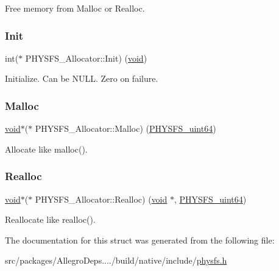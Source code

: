 Free memory from Malloc or Realloc. \mbox{\label{struct_p_h_y_s_f_s___allocator_a61dd95a74a5c9557645249b30e41d933}} 
\subsubsection{\texorpdfstring{Init}{Init}}
{\footnotesize\ttfamily int($\ast$ P\+H\+Y\+S\+F\+S\+\_\+\+Allocator\+::\+Init) (\hyperlink{png_8h_ac9c84fa68bbad002983e35ce3663c686}{void})}

Initialize. Can be N\+U\+LL. Zero on failure. \mbox{\label{struct_p_h_y_s_f_s___allocator_a470bc12185fbcef62ebf509fdf1870b5}} 
\subsubsection{\texorpdfstring{Malloc}{Malloc}}
{\footnotesize\ttfamily \hyperlink{png_8h_ac9c84fa68bbad002983e35ce3663c686}{void}$\ast$($\ast$ P\+H\+Y\+S\+F\+S\+\_\+\+Allocator\+::\+Malloc) (\hyperlink{physfs_8h_a632ba02500231e5f6f6df2e4cb71c818}{P\+H\+Y\+S\+F\+S\+\_\+uint64})}

Allocate like malloc(). \mbox{\label{struct_p_h_y_s_f_s___allocator_abc71951013cda22b8177b831bfaf8579}} 
\subsubsection{\texorpdfstring{Realloc}{Realloc}}
{\footnotesize\ttfamily \hyperlink{png_8h_ac9c84fa68bbad002983e35ce3663c686}{void}$\ast$($\ast$ P\+H\+Y\+S\+F\+S\+\_\+\+Allocator\+::\+Realloc) (\hyperlink{png_8h_ac9c84fa68bbad002983e35ce3663c686}{void} $\ast$, \hyperlink{physfs_8h_a632ba02500231e5f6f6df2e4cb71c818}{P\+H\+Y\+S\+F\+S\+\_\+uint64})}

Reallocate like realloc(). 

The documentation for this struct was generated from the following file\+:\begin{DoxyCompactItemize}
\item 
src/packages/\+Allegro\+Deps..../build/native/include/\hyperlink{physfs_8h}{physfs.\+h}\end{DoxyCompactItemize}

